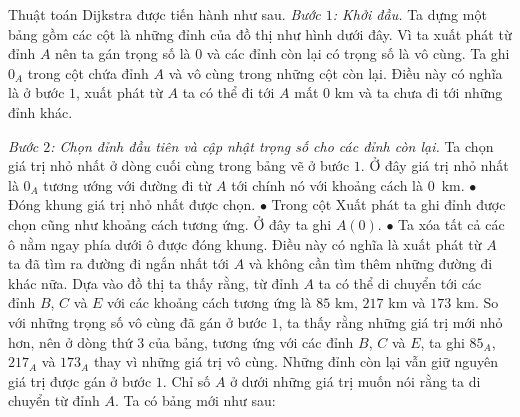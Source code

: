 \begin{multicols}{2}
\begin{figure}[H]
		\vspace*{-10pt}
	\end{figure}
	Thuật toán Dijkstra được tiến hành như sau.
	\vskip 0.1cm
	\textit{Bước $1$: Khởi đầu.} Ta dựng một bảng gồm các cột là những đỉnh của đồ thị như hình dưới đây. Vì ta xuất phát từ đỉnh $A$ nên ta gán trọng số là $0$ và các đỉnh còn lại có trọng số là vô cùng. Ta ghi $0_A$ trong cột chứa đỉnh $A$ và vô cùng trong những cột còn lại. Điều này có nghĩa là ở bước $1$, xuất phát từ $A$ ta có thể đi tới $A$ mất $0$ km và ta chưa đi tới những đỉnh khác. 
	\begin{table}[H]
		\vspace*{-5pt}
		\centering
		\captionsetup{labelformat= empty, justification=centering}
		\vspace*{-10pt}
	\end{table}
	\textit{Bước $2$: Chọn đỉnh đầu tiên và cập nhật trọng số cho các đỉnh còn lại.}   
	Ta chọn giá trị nhỏ nhất ở dòng cuối cùng trong bảng vẽ ở bước $1$. Ở đây giá trị nhỏ nhất là $0_A$ tương ướng với đường đi từ $A$ tới chính nó với khoảng cách là $0$~km.
	\vskip 0.1cm
	$\bullet$ Đóng khung giá trị nhỏ nhất được chọn. 
	\vskip 0.1cm
	$\bullet$ Trong cột Xuất phát ta ghi đỉnh được chọn cũng như khoảng cách tương ứng. Ở đây ta ghi $A(0)$.
	\vskip 0.1cm
	$\bullet$ Ta xóa tất cả các ô nằm ngay phía dưới ô được đóng khung. Điều này có nghĩa là xuất phát từ $A$ ta đã tìm ra đường đi ngắn nhất tới $A$ và không cần tìm thêm những đường đi khác nữa.
	\vskip 0.1cm 
	Dựa vào đồ thị ta thấy rằng, từ đỉnh $A$ ta có thể di chuyển tới các đỉnh $B$, $C$ và $E$ với các khoảng cách tương ứng là $85$ km, $217$ km và $173$ km. So với những trọng số vô cùng đã gán ở bước $1$, ta thấy rằng những giá trị mới nhỏ hơn, nên ở dòng thứ $3$ của bảng, tương ứng với các đỉnh $B$, $C$ và $E$, ta ghi $85_A$, $217_A$ và $173_A$ thay vì những giá trị vô cùng. Những đỉnh còn lại vẫn giữ nguyên giá trị được gán ở bước $1$. Chỉ số $A$ ở dưới những giá trị muốn nói rằng ta di chuyển từ đỉnh $A$.
	\vskip 0.1cm 
	Ta có bảng mới như sau: 

\end{multicols}
